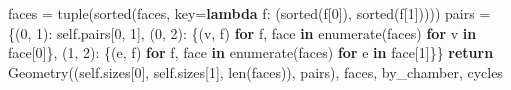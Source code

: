 \documentclass[
  10pt,
  letterpaper,
]{article}
\newenvironment{Shaded}{}{}
\newcommand{\BuiltInTok}[1]{\textcolor[rgb]{0.00,0.50,0.00}{#1}}
\newcommand{\ControlFlowTok}[1]{\textcolor[rgb]{0.00,0.44,0.13}{\textbf{#1}}}
\newcommand{\DecValTok}[1]{\textcolor[rgb]{0.25,0.63,0.44}{#1}}
\newcommand{\KeywordTok}[1]{\textcolor[rgb]{0.00,0.44,0.13}{\textbf{#1}}}
\newcommand{\NormalTok}[1]{#1}
\newcommand{\OperatorTok}[1]{\textcolor[rgb]{0.40,0.40,0.40}{#1}}
\newcommand{\VariableTok}[1]{\textcolor[rgb]{0.10,0.09,0.49}{#1}}
\begin{document}
\begin{Shaded}
\begin{Highlighting}[]
\NormalTok{        faces }\OperatorTok{=} \BuiltInTok{tuple}\NormalTok{(}\BuiltInTok{sorted}\NormalTok{(faces, key}\OperatorTok{=}\KeywordTok{lambda}\NormalTok{ f: (}\BuiltInTok{sorted}\NormalTok{(f[}\DecValTok{0}\NormalTok{]), }\BuiltInTok{sorted}\NormalTok{(f[}\DecValTok{1}\NormalTok{]))))}
\NormalTok{        pairs }\OperatorTok{=}\NormalTok{ \{(}\DecValTok{0}\NormalTok{, }\DecValTok{1}\NormalTok{): }\VariableTok{self}\NormalTok{.pairs[}\DecValTok{0}\NormalTok{, }\DecValTok{1}\NormalTok{],}
\NormalTok{                 (}\DecValTok{0}\NormalTok{, }\DecValTok{2}\NormalTok{): \{(v, f) }\ControlFlowTok{for}\NormalTok{ f, face }\KeywordTok{in} \BuiltInTok{enumerate}\NormalTok{(faces) }\ControlFlowTok{for}\NormalTok{ v }\KeywordTok{in}\NormalTok{ face[}\DecValTok{0}\NormalTok{]\},}
\NormalTok{                 (}\DecValTok{1}\NormalTok{, }\DecValTok{2}\NormalTok{): \{(e, f) }\ControlFlowTok{for}\NormalTok{ f, face }\KeywordTok{in} \BuiltInTok{enumerate}\NormalTok{(faces) }\ControlFlowTok{for}\NormalTok{ e }\KeywordTok{in}\NormalTok{ face[}\DecValTok{1}\NormalTok{]\}\}}
        \ControlFlowTok{return}\NormalTok{ Geometry((}\VariableTok{self}\NormalTok{.sizes[}\DecValTok{0}\NormalTok{], }\VariableTok{self}\NormalTok{.sizes[}\DecValTok{1}\NormalTok{], }\BuiltInTok{len}\NormalTok{(faces)), pairs), faces, by\_chamber, cycles}



\end{Highlighting}
\end{Shaded}
\end{document}
